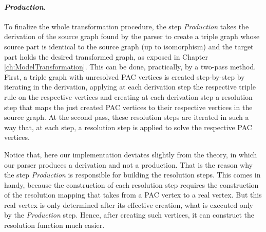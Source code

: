 \paragraph*{\emph{Production}.} To finalize the whole transformation procedure, the step \emph{Production} takes the derivation of the source graph found by the parser to create a triple graph whose source part is identical to the source graph (up to isomorphism) and the target part holds the desired transformed graph, as exposed in Chapter \ref{ch:ModelTransformation}. This can be done, practically, by a two-pass method. First, a triple graph with unresolved PAC vertices is created step-by-step by iterating in the derivation, applying at each derivation step the respective triple rule on the respective vertices and creating at each derivation step a resolution step that maps the just created PAC vertices to their respective vertices in the source graph. At the second pass, these resolution steps are iterated in such a way that, at each step, a resolution step is applied to solve the respective PAC vertices.

Notice that, here our implementation deviates slightly from the theory, in which our parser produces a derivation and not a production. That is the reason why the step \emph{Production} is responsible for building the resolution steps. This comes in handy, because the construction of each resolution step requires the construction of the resolution mapping that takes from a PAC vertex to a real vertex. But this real vertex is only determined after its effective creation, what is executed only by the \emph{Production} step. Hence, after creating such vertices, it can construct the resolution function much easier.

